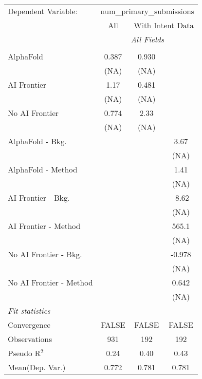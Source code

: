 \begingroup
\centering
\begin{tabular}{lccc}
   \tabularnewline \midrule \midrule
   Dependent Variable: & \multicolumn{3}{c}{num\_primary\_submissions}\\
 & \multicolumn{1}{c}{All} & \multicolumn{2}{c}{With Intent Data} \\
\cmidrule(lr){2-2} \cmidrule(lr){3-4}
 & \multicolumn{3}{c}{\textit{All Fields}} \\ \\
   AlphaFold               & 0.387 & 0.930 &   \\   
                           & (NA)  & (NA)  &   \\   
   AI Frontier             & 1.17  & 0.481 &   \\   
                           & (NA)  & (NA)  &   \\   
   No AI Frontier          & 0.774 & 2.33  &   \\   
                           & (NA)  & (NA)  &   \\   
   AlphaFold - Bkg.        &       &       & 3.67\\   
                           &       &       & (NA)\\   
   AlphaFold - Method      &       &       & 1.41\\   
                           &       &       & (NA)\\   
   AI Frontier - Bkg.      &       &       & -8.62\\   
                           &       &       & (NA)\\   
   AI Frontier - Method    &       &       & 565.1\\   
                           &       &       & (NA)\\   
   No AI Frontier - Bkg.   &       &       & -0.978\\   
                           &       &       & (NA)\\   
   No AI Frontier - Method &       &       & 0.642\\   
                           &       &       & (NA)\\   
   \midrule
   \emph{Fit statistics}\\
   Convergence             &FALSE  & FALSE & FALSE\\  
   Observations            & 931   & 192   & 192\\  
   Pseudo R$^2$            & 0.24  & 0.40  & 0.43\\  
Mean(Dep. Var.) & 0.772 & 0.781 & 0.781 \\
   

\end{tabular}
